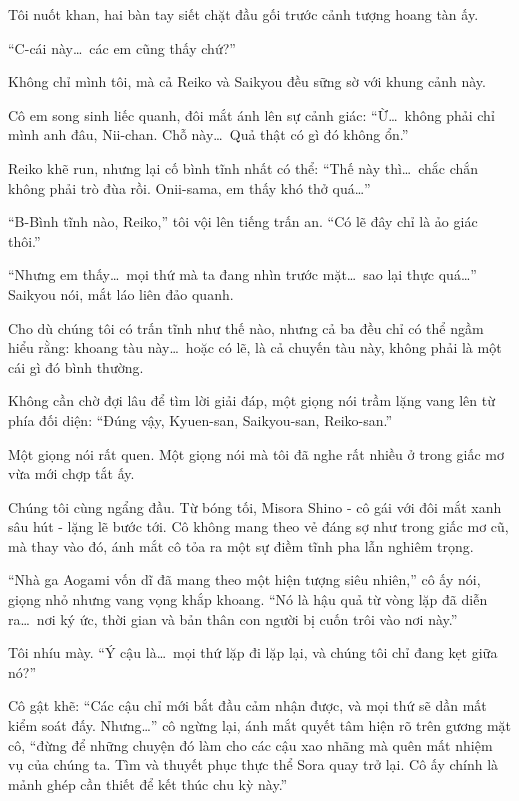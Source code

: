 \documentclass[../main.tex]{subfiles}
\begin{document}
Tôi nuốt khan, hai bàn tay siết chặt đầu gối trước cảnh tượng hoang tàn ấy.

``C-cái này\dots\ các em cũng thấy chứ?''

Không chỉ mình tôi, mà cả Reiko và Saikyou đều sững sờ với khung cảnh này.

Cô em song sinh liếc quanh, đôi mắt ánh lên sự cảnh giác: ``Ừ\dots\ không phải chỉ mình anh đâu, Nii-chan. Chỗ này\dots\ Quả thật có gì đó không ổn.''

Reiko khẽ run, nhưng lại cố bình tĩnh nhất có thể: ``Thế này thì\dots\ chắc chắn không phải trò đùa rồi. Onii-sama, em thấy khó thở quá\dots''

``B-Bình tĩnh nào, Reiko,'' tôi vội lên tiếng trấn an. ``Có lẽ đây chỉ là ảo giác thôi.''

``Nhưng em thấy\dots\ mọi thứ mà ta đang nhìn trước mặt\dots\ sao lại thực quá\dots'' Saikyou nói, mắt láo liên đảo quanh.

Cho dù chúng tôi có trấn tĩnh như thế nào, nhưng cả ba đều chỉ có thể ngầm hiểu rằng: khoang tàu này\dots\ hoặc có lẽ, là cả chuyến tàu này, không phải là một cái gì đó bình thường.

Không cần chờ đợi lâu để tìm lời giải đáp, một giọng nói trầm lặng vang lên từ phía đối diện: ``Đúng vậy, Kyuen-san, Saikyou-san, Reiko-san.''

Một giọng nói rất quen. Một giọng nói mà tôi đã nghe rất nhiều ở trong giấc mơ vừa mới chợp tắt ấy.

Chúng tôi cùng ngẩng đầu. Từ bóng tối, Misora Shino - cô gái với đôi mắt xanh sâu hút - lặng lẽ bước tới. Cô không mang theo vẻ đáng sợ như trong giấc mơ cũ, mà thay vào đó, ánh mắt cô tỏa ra một sự điềm tĩnh pha lẫn nghiêm trọng.


``Nhà ga Aogami vốn dĩ đã mang theo một hiện tượng siêu nhiên,'' cô ấy nói, giọng nhỏ nhưng vang vọng khắp khoang. ``Nó là hậu quả từ vòng lặp đã diễn ra\dots\ nơi ký ức, thời gian và bản thân con người bị cuốn trôi vào nơi này.''

Tôi nhíu mày. ``Ý cậu là\dots\ mọi thứ lặp đi lặp lại, và chúng tôi chỉ đang kẹt giữa nó?''

Cô gật khẽ: ``Các cậu chỉ mới bắt đầu cảm nhận được, và mọi thứ sẽ dần mất kiểm soát đấy. Nhưng\dots'' cô ngừng lại, ánh mắt quyết tâm hiện rõ trên gương mặt cô, ``đừng để những chuyện đó làm cho các cậu xao nhãng mà quên mất nhiệm vụ của chúng ta. Tìm và thuyết phục thực thể Sora quay trở lại. Cô ấy chính là mảnh ghép cần thiết để kết thúc chu kỳ này.''
\end{document}
